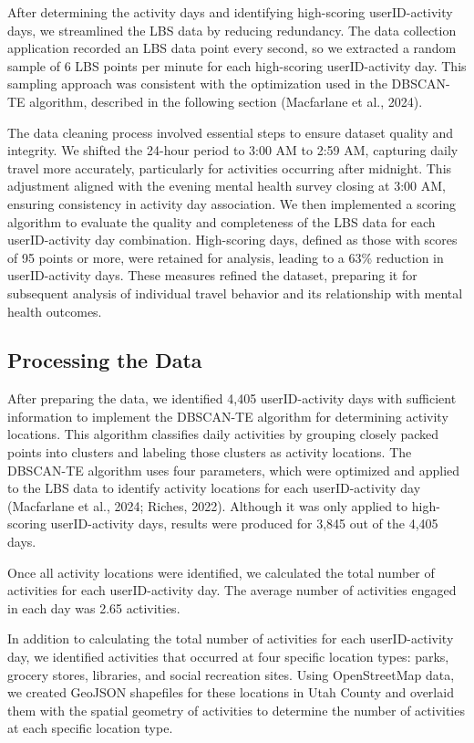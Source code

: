 \documentclass[
  letterpaper,
  number,
  review,
  3p]{elsarticle}
\begin{document}
After determining the activity days and identifying high-scoring
userID-activity days, we streamlined the LBS data by reducing
redundancy. The data collection application recorded an LBS data point
every second, so we extracted a random sample of 6 LBS points per minute
for each high-scoring userID-activity day. This sampling approach was
consistent with the optimization used in the DBSCAN-TE algorithm,
described in the following section (Macfarlane et al., 2024).

The data cleaning process involved essential steps to ensure dataset
quality and integrity. We shifted the 24-hour period to 3:00 AM to 2:59
AM, capturing daily travel more accurately, particularly for activities
occurring after midnight. This adjustment aligned with the evening
mental health survey closing at 3:00 AM, ensuring consistency in
activity day association. We then implemented a scoring algorithm to
evaluate the quality and completeness of the LBS data for each
userID-activity day combination. High-scoring days, defined as those
with scores of 95 points or more, were retained for analysis, leading to
a 63\% reduction in userID-activity days. These measures refined the
dataset, preparing it for subsequent analysis of individual travel
behavior and its relationship with mental health outcomes.

\subsection{Processing the Data}\label{processing-the-data}

After preparing the data, we identified 4,405 userID-activity days with
sufficient information to implement the DBSCAN-TE algorithm for
determining activity locations. This algorithm classifies daily
activities by grouping closely packed points into clusters and labeling
those clusters as activity locations. The DBSCAN-TE algorithm uses four
parameters, which were optimized and applied to the LBS data to identify
activity locations for each userID-activity day (Macfarlane et al.,
2024; Riches, 2022). Although it was only applied to high-scoring
userID-activity days, results were produced for 3,845 out of the 4,405
days.

Once all activity locations were identified, we calculated the total
number of activities for each userID-activity day. The average number of
activities engaged in each day was 2.65 activities.

In addition to calculating the total number of activities for each
userID-activity day, we identified activities that occurred at four
specific location types: parks, grocery stores, libraries, and social
recreation sites. Using OpenStreetMap data, we created GeoJSON
shapefiles for these locations in Utah County and overlaid them with the
spatial geometry of activities to determine the number of activities at
each specific location type.
\end{document}
